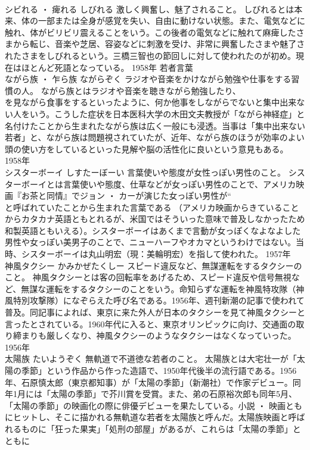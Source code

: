 \documentclass[8pt]{extreport}
\begin{document}
\begin{CJK}{UTF8}{min}
\\	シビれる ・ 痺れる	しびれる	激しく興奮し、魅了されること。	しびれるとは本来、体の一部または全身が感覚を失い、自由に動けない状態。また、電気などに触れ、体がビリビリ震えることをいう。この後者の電気などに触れて麻痺したさまから転じ、音楽や芝居、容姿などに刺激を受け、非常に興奮したさまや魅了されたさまをしびれるという。三橋三智也の節回しに対して使われたのが初め。現在はほとんど死語となっている。	1958年	若者言葉	
\\	ながら族 ・ 乍ら族	ながらぞく	ラジオや音楽をかけながら勉強や仕事をする習慣の人。	ながら族とはラジオや音楽を聴きながら勉強したり、
\\	を見ながら食事をするといったように、何か他事をしながらでないと集中出来ない人をいう。こうした症状を日本医科大学の木田文夫教授が「ながら神経症」と名付けたことから生まれたながら族は広く一般にも浸透。当事は「集中出来ない若者」と、ながら族は問題視されていたが、近年、ながら族のほうが効率のよい頭の使い方をしているといった見解や脳の活性化に良いという意見もある。	1958年	
\\	シスターボーイ	しすたーぼーい	言葉使いや態度が女性っぽい男性のこと。	シスターボーイとは言葉使いや態度、仕草などが女っぽい男性のことで、アメリカ映画『お茶と同情』でジョン ・ カーが演じた女っぽい男性が“
\\	と呼ばれていたことから生まれた言葉である （アメリカ映画からきていることからカタカナ英語ともとれるが、米国ではそういった意味で普及しなかったため和製英語ともいえる）。シスターボーイはあくまで言動が女っぽくなよなよした男性や女っぽい美男子のことで、ニューハーフやオカマというわけではない。当時、シスターボーイは丸山明宏（現：美輪明宏）を指して使われた。	1957年	
\\	神風タクシー	かみかぜたくしー	スピード違反など、無謀運転をするタクシーのこと。	神風タクシーとは客の回転率をあげるため、スピード違反や信号無視など、無謀な運転をするタクシーのことをいう。命知らずな運転を神風特攻隊（神風特別攻撃隊）になぞらえた呼び名である。1956年、週刊新潮の記事で使われて普及。同記事によれば、東京に来た外人が日本のタクシーを見て神風タクシーと言ったとされている。1960年代に入ると、東京オリンピックに向け、交通面の取り締まりも厳しくなり、神風タクシーのようなタクシーはなくなっていった。	1956年	
\\	太陽族	たいようぞく	無軌道で不道徳な若者のこと。	太陽族とは大宅壮一が「太陽の季節」という作品から作った造語で、1950年代後半の流行語である。1956年、石原慎太郎（東京都知事）が「太陽の季節」（新潮社）で作家デビュー。同年1月には「太陽の季節」で芥川賞を受賞。また、弟の石原裕次郎も同年5月、「太陽の季節」の映画化の際に俳優デビューを果たしている。小説 ・ 映画ともにヒットし、そこに描かれる無軌道な若者を太陽族と呼んだ。太陽族映画と呼ばれるものに「狂った果実」「処刑の部屋」があるが、これらは「太陽の季節」とともに

\end{CJK}
\end{document}
